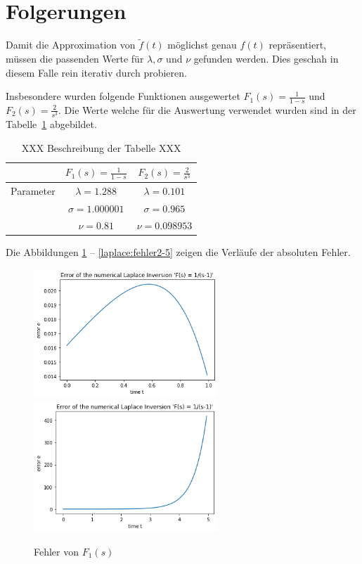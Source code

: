 %
%
%

\section{Folgerungen
\label{laplace:section:folgerungen}}
Damit die Approximation von $\tilde{f}(t)$ möglichst genau $f(t)$ repräsentiert,
müssen die passenden Werte für $\lambda, \sigma $ und $\nu $ gefunden werden. 
Dies geschah in diesem Falle rein iterativ durch probieren.

Insbesondere wurden folgende Funktionen ausgewertet $ F_{1}(s)=\frac{1}{1-s} $ und $F_{2}(s) = \frac{2}{s^{3}}$. 
Die Werte welche für die Auswertung verwendet wurden sind in der Tabelle~\ref{laplace:parametertabelle} abgebildet.

\begin{table}
\centering
\begin{tabular}[c]{c|c|c}
& $F_{1}(s)=\frac{1}{1-s}$ & $F_{2}(s) = \frac{2}{s^{3}}$ \\
\hline
Parameter & $\lambda=1.288$ & $\lambda=0.101$ \\
& $\sigma=1.000001$ & $\sigma=0.965$ \\
& $\nu=0.81$ & $\nu=0.098953$ \\
\end{tabular}
\caption{XXX Beschreibung der Tabelle XXX
\label{laplace:parametertabelle}}
\end{table}
Die Abbildungen \ref{laplace:fehlerf1} -- \ref{laplace:fehler2-5} zeigen die Verläufe der absoluten Fehler.

\begin{figure}
\centering
\includegraphics[width=6.9cm]{papers/laplace/Error_1divide_sminus1}
\includegraphics[width=6.9cm]{papers/laplace/Error_1divide_sminus1_bis_tgleich5}
\caption{Fehler von $F_{1}(s)$
\label{laplace:fehlerf1}
}
\end{figure}

